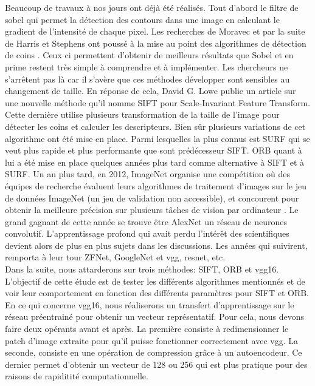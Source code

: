 \documentclass[conference]{IEEEtran}
\begin{document}
Beaucoup de travaux à nos jours ont déjà été réalisés. Tout d'abord le filtre de sobel \cite{b5} qui permet la détection des contours dans une image en calculant le gradient de l'intensité de chaque pixel. Les recherches de Moravec et par la suite de Harris et Stephens ont poussé à la mise au point des algorithmes de détection de coins \cite{b6}. Ceux ci permettent d'obtenir de meilleurs résultats que Sobel et en prime restent très simple à comprendre et à implémenter. Les chercheurs ne s'arrêtent pas là car il s'avère que ces méthodes développer sont sensibles au changement de taille. En réponse de cela, David G. Lowe publie un article \cite{b1} sur une nouvelle méthode qu'il nomme SIFT pour Scale-Invariant Feature Transform. Cette dernière utilise plusieurs transformation de la taille de l'image pour détecter les coins et calculer les descripteurs. Bien sûr plusieurs variations de cet algorithme ont été mise en place. Parmi lesquelles la plus connus est SURF qui se veut plus rapide et plus performante que sont prédécesseur SIFT. ORB \cite{b2} quant à lui a été mise en place quelques années plus tard comme alternative à SIFT et à SURF. Un an plus tard, en 2012, ImageNet organise une compétition où des équipes de recherche évaluent leurs algorithmes de traitement d'images sur le jeu de données ImageNet (un jeu de validation non accessible), et concourent pour obtenir la meilleure précision sur plusieurs tâches de vision par ordinateur \cite{b7}. Le grand gagnant de cette année se trouve être AlexNet un réseau de neurones convolutif. L'apprentissage profond qui avait perdu l'intérêt des scientifiques devient alors de plus en plus sujets dans les discussions. Les années qui suivirent, remporta à leur tour ZFNet, GoogleNet et vgg, resnet, etc.\\

Dans la suite, nous attarderons sur trois méthodes: SIFT, ORB et vgg16. L'objectif de cette étude est de tester les différents algorithmes mentionnés et de voir leur comportement en fonction des différents paramètres pour SIFT et ORB. En ce qui concerne vgg16, nous réaliserons un transfert d'apprentissage sur le réseau préentrainé pour obtenir un vecteur représentatif. Pour cela, nous devons faire deux opérants avant et après. La première consiste à redimensionner le patch d'image extraite pour qu'il puisse fonctionner correctement avec vgg. La seconde, consiste en une opération de compression grâce à un autoencodeur. Ce dernier permet d'obtenir un vecteur de 128 ou 256 qui est plus pratique pour des raisons de rapiditité computationnelle.  
\end{document}
